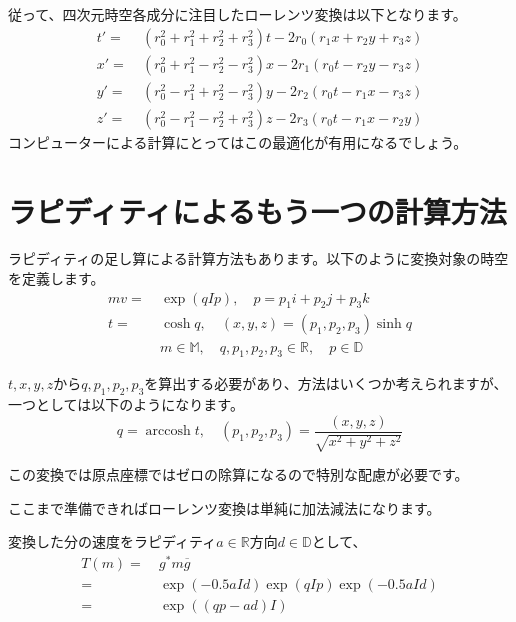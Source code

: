 \documentclass[a4paper,12pt,notitlepage]{jsreport}
\DeclareMathOperator\arccosh{arccosh}
\begin{document}
従って、四次元時空各成分に注目したローレンツ変換は以下となります。
\begin{equation}
  \begin{split}
    t'=~&(r_0^2+r_1^2+r_2^2+r_3^2)t-2r_0(r_1x+r_2y+r_3z)\\
    x'=~&(r_0^2+r_1^2-r_2^2-r_3^2)x-2r_1(r_0t-r_2y-r_3z)\\
    y'=~&(r_0^2-r_1^2+r_2^2-r_3^2)y-2r_2(r_0t-r_1x-r_3z)\\
    z'=~&(r_0^2-r_1^2-r_2^2+r_3^2)z-2r_3(r_0t-r_1x-r_2y)
  \end{split}
\end{equation}
コンピューターによる計算にとってはこの最適化が有用になるでしょう。

\section{ラピディティによるもう一つの計算方法}

ラピディティの足し算による計算方法もあります。以下のように変換対象の時空を定義します。
\begin{equation}
  \begin{split}
    mv=~&\exp(qIp),\quad p=p_1i+p_2j+p_3k\\
    t=~&\cosh q,\quad (x,y,z)=(p_1,p_2,p_3)\sinh q\\
    &m\in\mathbb{M},\quad q,p_1,p_2,p_3\in\mathbb{R},\quad p\in\mathbb{D}
  \end{split}
\end{equation}

$t,x,y,z$から$q,p_1,p_2,p_3$を算出する必要があり、方法はいくつか考えられますが、一つとしては以下のようになります。
\begin{equation}
  q=\arccosh t,\quad (p_1,p_2,p_3)=\frac{(x,y,z)}{\sqrt{x^2+y^2+z^2}}
\end{equation}

この変換では原点座標ではゼロの除算になるので特別な配慮が必要です。

ここまで準備できればローレンツ変換は単純に加法減法になります。

変換した分の速度をラピディティ$a\in\mathbb{R}$方向$d\in\mathbb{D}$として、
\begin{equation}
  \begin{split}
    T(m)=~&g^*m\overline{g}\\
    =~&\exp(-0.5aId)\exp(qIp)\exp(-0.5aId)\\
    =~&\exp((qp-ad)I)
  \end{split}
\end{equation}
\end{document}
